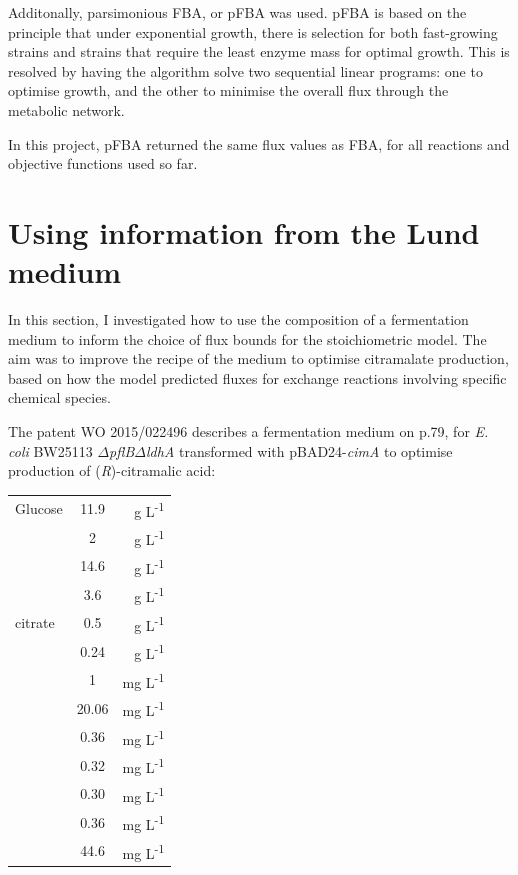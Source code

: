 \documentclass[parskip=full, numbers=noenddot]{scrreprt}
\begin{document}
  Additonally, parsimonious FBA, or pFBA \citep{lewis_omic_2010} was used. pFBA is based on the principle that under exponential growth, there is selection for both fast-growing strains and strains that require the least enzyme mass for optimal growth. This is resolved by having the algorithm solve two sequential linear programs: one to optimise growth, and the other to minimise the overall flux through the metabolic network.

  In this project, pFBA returned the same flux values as FBA, for all reactions and objective functions used so far.

\section{Using information from the Lund medium}
\label{sec:lund}

In this section, I investigated how to use the composition of a fermentation medium to inform the choice of flux bounds for the stoichiometric model. The aim was to improve the recipe of the medium to optimise citramalate production, based on how the model predicted fluxes for exchange reactions involving specific chemical species.

The patent WO 2015/022496 \citep{eastham_process_2015} describes a fermentation medium on p.79, for \emph{E. coli} BW25113 $\Delta$\emph{pflB}$\Delta$\emph{ldhA} transformed with pBAD24-\emph{cimA} to optimise production of (\emph{R})-citramalic acid:

\begin{center}
\begin{tabular}{lSr}
  Glucose & 11.9 & g L\textsuperscript{-1}\\
   & 2 & g L\textsuperscript{-1}\\
   & 14.6 & g L\textsuperscript{-1}\\
   & 3.6 & g L\textsuperscript{-1}\\
   citrate & 0.5 & g L\textsuperscript{-1}\\
   & 0.24 & g L\textsuperscript{-1}\\
   & 1 & mg L\textsuperscript{-1}\\
   & 20.06 & mg L\textsuperscript{-1}\\
   & 0.36 & mg L\textsuperscript{-1}\\
   & 0.32 & mg L\textsuperscript{-1}\\
   & 0.30 & mg L\textsuperscript{-1}\\
   & 0.36 & mg L\textsuperscript{-1}\\
   & 44.6 & mg L\textsuperscript{-1}                             
\end{tabular}
\end{center}
\end{document}
